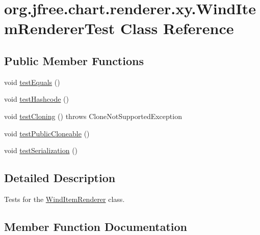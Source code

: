 \hypertarget{classorg_1_1jfree_1_1chart_1_1renderer_1_1xy_1_1_wind_item_renderer_test}{}\section{org.\+jfree.\+chart.\+renderer.\+xy.\+Wind\+Item\+Renderer\+Test Class Reference}
\label{classorg_1_1jfree_1_1chart_1_1renderer_1_1xy_1_1_wind_item_renderer_test}
\subsection*{Public Member Functions}
\begin{DoxyCompactItemize}
\item 
void \mbox{\hyperlink{classorg_1_1jfree_1_1chart_1_1renderer_1_1xy_1_1_wind_item_renderer_test_a963234cdfc4eb09c19c37818238d81a7}{test\+Equals}} ()
\item 
void \mbox{\hyperlink{classorg_1_1jfree_1_1chart_1_1renderer_1_1xy_1_1_wind_item_renderer_test_aadb26b7e7c24ffb6a045c81f3b34f8e1}{test\+Hashcode}} ()
\item 
void \mbox{\hyperlink{classorg_1_1jfree_1_1chart_1_1renderer_1_1xy_1_1_wind_item_renderer_test_a598d5b1677611a12759db2a877763d0d}{test\+Cloning}} ()  throws Clone\+Not\+Supported\+Exception 
\item 
void \mbox{\hyperlink{classorg_1_1jfree_1_1chart_1_1renderer_1_1xy_1_1_wind_item_renderer_test_a44a6231a76cbaa8e027017ffbdbe0e3d}{test\+Public\+Cloneable}} ()
\item 
void \mbox{\hyperlink{classorg_1_1jfree_1_1chart_1_1renderer_1_1xy_1_1_wind_item_renderer_test_a5d07bdf38b35cf331001102a6a02c6b5}{test\+Serialization}} ()
\end{DoxyCompactItemize}


\subsection{Detailed Description}
Tests for the \mbox{\hyperlink{classorg_1_1jfree_1_1chart_1_1renderer_1_1xy_1_1_wind_item_renderer}{Wind\+Item\+Renderer}} class. 

\subsection{Member Function Documentation}
\mbox{\label{classorg_1_1jfree_1_1chart_1_1renderer_1_1xy_1_1_wind_item_renderer_test_a598d5b1677611a12759db2a877763d0d}} 
